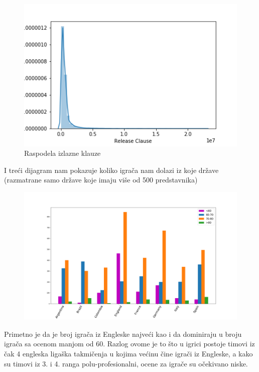 \documentclass[a4paper, 11pt]{article}
\begin{document}
\begin{figure}[h]
\centering
\graphicspath{{../}}
\includegraphics[scale=0.45]{stat2.png}
\caption{Raspodela izlazne klauze}

\end{figure}




I tre\'{c}i dijagram nam pokazuje koliko igra\v{c}a nam dolazi 
iz koje dr\v{z}ave (razmatrane samo dr\v{z}ave koje imaju vi\v{s}e od 500 predstavnika)


\begin{figure}[h]
\centering
\graphicspath{{../}}
\includegraphics[scale=0.285]{stat3.png}
\caption{}

\end{figure}

Primetno je da je broj igra\v{c}a iz Engleske najve\'{c}i kao
i da dominiraju u broju igra\v{c}a sa ocenom manjom od 60.
Razlog ovome je to \v{s}to u igrici postoje timovi iz \v{c}ak
4 engleska liga\v{s}ka takmi\v{c}enja u kojima ve\'{c}inu \v{c}ine
igra\v{c}i iz Engleske, a kako su timovi iz 3. i 4. ranga polu-profesionalni,
ocene za igra\v{c}e su o\v{c}ekivano niske.
\pagebreak
\end{document}

